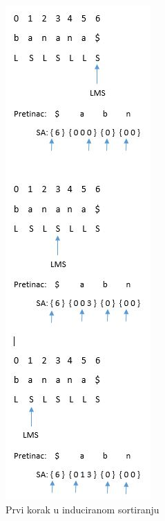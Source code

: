 \begin{figure}[H]
   \centering
       \includegraphics{./pictures/SAISstep1.jpg}
 \caption{Prvi korak u induciranom sortiranju}
 \label{fig:sais1}
\end{figure}



